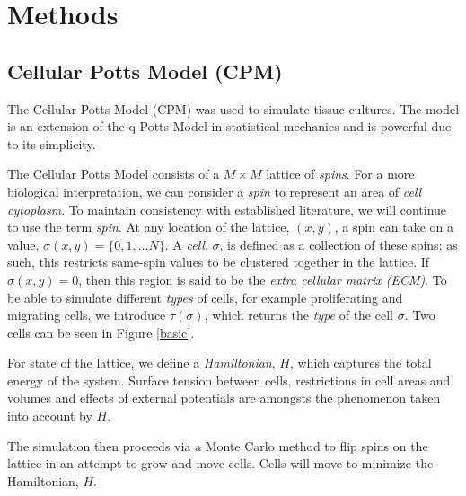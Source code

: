 \documentclass[12pt]{article}
\begin{document}
% 
% 

\section{Methods}
\subsection{Cellular Potts Model (CPM)}
The Cellular Potts Model (CPM) \cite{Graner1992} was used to simulate tissue cultures. The model is an extension of the q-Potts Model in statistical mechanics and is powerful due to its simplicity. 

The Cellular Potts Model consists of a $M\times M$ lattice of \emph{spins}. For a more biological interpretation, we can consider a \emph{spin} to represent an area of \emph{cell cytoplasm}. To maintain consistency with established literature, we will continue to use the term \emph{spin}. At any location of the lattice, $(x,y)$, a spin can take on a value, $\sigma(x,y) = \{0,1,\ldots N\}$. A \emph{cell}, $\sigma$, is defined as a collection of these spins; as such, this restricts same-spin values to be clustered together in the lattice. If $\sigma(x,y) = 0$, then this region is said to be the \emph{extra cellular matrix (ECM)}. To be able to simulate different \emph{types} of cells, for example proliferating and migrating cells, we introduce $\tau(\sigma)$, which returns the \emph{type} of the cell $\sigma$. Two cells can be seen in Figure \ref{basic}.

For state of the lattice, we define a \emph{Hamiltonian}, $H$, which captures the total energy of the system. Surface tension between cells, restrictions in cell areas and volumes and effects of external potentials are amongsts the phenomenon taken into account by $H$.

The simulation then proceeds via a Monte Carlo method to flip spins on the lattice in an attempt to grow and move cells. Cells will move to minimize the Hamiltonian, $H$.


\end{document}
